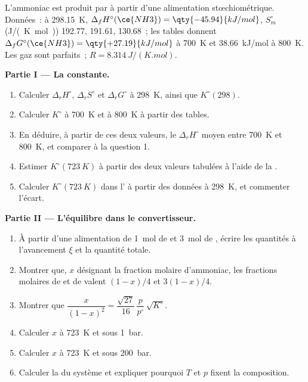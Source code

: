 \begin{problem}
\label{pb:b2:equilibrium-shifts:1}
L'ammoniac est produit par  à partir d'une alimentation stœchiométrique.
Données~: à \qty{298.15}{K}, $\Delta_f H^\circ(\ce{NH3}) = \qty{-45.94}{kJ/mol}$,
$S^\circ_m$ (\unit{J/(K.mol)})  192.77,  191.61,  130.68~;
les tables donnent $\Delta_f G^\circ(\ce{NH3}) = \qty{+27.19}{kJ/mol}$ à
\qty{700}{K} et \qty{+38.66}{kJ/mol} à \qty{800}{K}. Les gaz sont parfaits~;
$R = \qty{8.314}{J/(K.mol)}$.

\medskip
\noindent\textbf{Partie I --- La constante.}
\begin{enumerate}
  \item Calculer $\Delta_r H^\circ$, $\Delta_r S^\circ$ et $\Delta_r G^\circ$ à
        \qty{298}{K}, ainsi que $K^\circ(298)$.
  \item Calculer $K^\circ$ à \qty{700}{K} et à \qty{800}{K} à partir des tables.
  \item En déduire, à partir de ces deux valeurs, le $\Delta_r H^\circ$ moyen entre
        \qty{700}{K} et \qty{800}{K}, et comparer à la question 1.
  \item Estimer $K^\circ(\qty{723}{K})$ à partir des deux valeurs tabulées à l'aide de
        la .
  \item Calculer $K^\circ(\qty{723}{K})$ dans l' à partir
        des données à \qty{298}{K}, et commenter l'écart.
\end{enumerate}

\medskip
\noindent\textbf{Partie II --- L'équilibre dans le convertisseur.}
\begin{enumerate}[resume]
  \item À partir d'une alimentation de \qty{1}{mol} de  et \qty{3}{mol} de , écrire les
        quantités à l'avancement $\xi$ et la quantité totale.
  \item Montrer que, $x$ désignant la fraction molaire d'ammoniac, les fractions molaires
        de  et de  valent $(1-x)/4$ et $3(1-x)/4$.
  \item Montrer que $\dfrac{x}{(1-x)^2} = \dfrac{\sqrt{27}}{16}\,\dfrac{p}{p^\circ}\,
        \sqrt{K^\circ}$.
  \item Calculer $x$ à \qty{723}{K} et sous \qty{1}{bar}.
  \item Calculer $x$ à \qty{723}{K} et sous \qty{200}{bar}.
  \item Calculer la  du système et expliquer pourquoi $T$ et $p$ fixent la
        composition.
\end{enumerate}


\end{problem}
